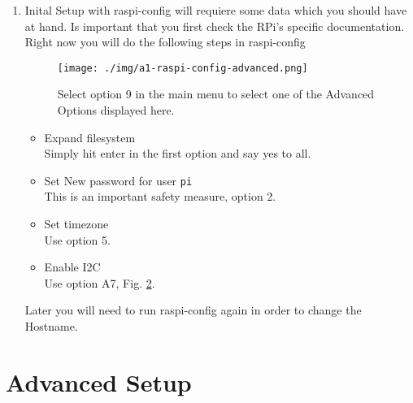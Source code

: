 \begin{enumerate}
    \begin{figure}[h!]
 \centering
 \texttt{[image: ./img/a1-raspi-config-0.png]}
 \caption{This is the first raspi-config screen, from here we will use option 1,2,5 and 9.}
 \label{fig:a1-raspi-config}
\end{figure}

    
    \item Inital Setup with raspi-config will requiere some data which you should have at hand. Is important that you first check
    the RPi's specific documentation. Right now you will do the following steps in raspi-config
    \begin{figure}[h!]
 \centering
 \texttt{[image: ./img/a1-raspi-config-advanced.png]}
 \caption{Select option 9 in the main menu to select one of the Advanced Options displayed here.}
 \label{fig:a1-raspi-config-advanced}
\end{figure}

    \begin{itemize}
     \item Expand filesystem\\ Simply hit enter in the first option and say yes to all.
     \item Set New password for user \verb=pi=\\ This is an important safety measure, option 2.
     \item Set timezone\\ Use option 5.
     \item Enable I2C\\ Use option A7, Fig. \ref{fig:a1-raspi-config-advanced}.
     
   
    \end{itemize}
    Later you will need to run raspi-config again in order to change the Hostname.
   \end{enumerate}
   
   

  \section{Advanced Setup}
